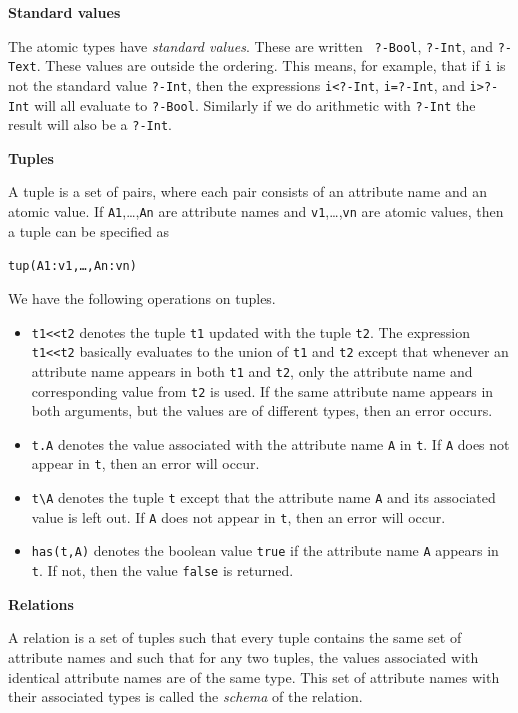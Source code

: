 \documentclass[a4,14pt,latin1]{article}
\begin{document}
\vspace{2ex}
{\bf Standard values}

The atomic types have {\em standard values}. These are written {\tt
  ?-Bool}, {\tt ?-Int}, and {\tt ?-Text}. These values are outside the
ordering. This means, for example, that if {\tt i} is not the standard
value {\tt ?-Int}, then the expressions {\tt i<?-Int}, {\tt i=?-Int},
and {\tt i>?-Int} will all evaluate to {\tt ?-Bool}. Similarly if we
do arithmetic with {\tt ?-Int} the result will also be a {\tt ?-Int}.

\vspace{2ex}
{\bf Tuples}

A tuple is a set of pairs, where each pair consists of an attribute name
and an atomic value. If {\tt A1},\ldots,{\tt An} are attribute names and
{\tt v1},\ldots,{\tt vn} are atomic values, then a tuple can be specified as
\begin{center}
{\tt tup(A1:v1,\ldots,An:vn)}
\end{center}
We have the following operations on tuples.
\begin{itemize}
\item
{\tt t1<<t2} denotes the tuple {\tt t1} updated with the tuple {\tt t2}.
The expression {\tt t1<<t2} basically evaluates to the union of
{\tt t1} and {\tt t2} except that whenever an attribute name appears in
both {\tt t1} and {\tt t2}, only the attribute name and corresponding value
from {\tt t2} is used.
If the same attribute name appears in both arguments, but the values are
of different types, then an error occurs.
\item
{\tt t.A} denotes the value associated with the attribute name {\tt A} in
{\tt t}. If {\tt A} does not appear in {\tt t}, then an error will occur.
\item
{\tt t\verb"\"A} denotes the tuple {\tt t}
except that the attribute name {\tt A}
and its associated value is left out.
If {\tt A} does not appear in {\tt t}, then an error will occur.
\item
{\tt has(t,A)} denotes the boolean value {\tt true} if the attribute name
{\tt A} appears in {\tt t}. If not, then the value {\tt false} is returned.
\end{itemize}

\vspace{2ex}
{\bf Relations}

A relation is a set of tuples such that every tuple contains the same set of
attribute names and such that for any two tuples, the values associated with
identical attribute names are of the same type. This set of attribute names
with their associated types is called the {\em schema\/} of the relation.
\end{document}
